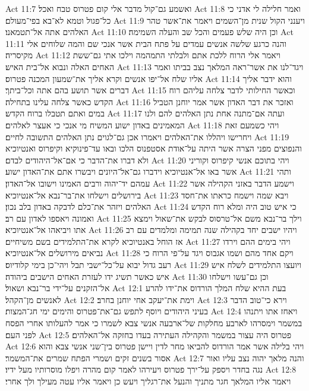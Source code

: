 Act 11:7  ואשמע גם־קול מדבר אלי קום פטרוס טבח ואכל׃
Act 11:8  ואמר חלילה לי אדני כי כל־פגול וטמא לא־בא בפי־מעולם׃
Act 11:9  ויענני הקול שנית מן־השמים ויאמר את־אשר טהר האלהים אתה אל־תטמאנו׃
Act 11:10  וכן היה שלש פעמים והכל שב והעלה השמימה׃
Act 11:11  והנה כרגע שלשה אנשים עמדים על פתח הבית אשר אנכי שם והמה שלוחים אלי מקיסריה׃
Act 11:12  ויאמר אלי הרוח ללכת אתם ולבלתי התמהמה וילכו אתי גם־ששת האחים האלה ונבוא אל־בית האיש׃
Act 11:13  ויגד־לנו את אשר־ראה המלאך נצב בביתו ואמר אליו שלח אל־יפו אנשים וקרא אליך את־שמעון המכנה פטרוס׃
Act 11:14  והוא ידבר אליך דברים אשר תושע בהם אתה וכל־ביתך׃
Act 11:15  וכאשר החילותי לדבר צלחה עליהם רוח הקדש כאשר צלחה עלינו בתחילה׃
Act 11:16  ואזכר את דבר האדון אשר אמר יוחנן הטביל במים ואתם תטבלו ברוח הקדש׃
Act 11:17  ועתה אם־מתנה אחת נתן האלהים להם ולנו המאמינים באדון ישוע המשיח מי אנכי כי אעצר לאלהים׃
Act 11:18  ויהי כשמעם זאת ויחרישו ויהללו את־האלהים ויאמרו אכן גם־לגוים נתן האלהים התשובה לחיים׃
Act 11:19  והנפוצים מפני הצרה אשר היתה על־אודת אסטפנוס הלכו ובאו עד־פינוקיא וקיפרוס ואנטיוכיא ולא דברו את־הדבר כי אם־אל־היהודים לבדם׃
Act 11:20  ויהי בתוכם אנשי קיפרוס וקוריני אשר באו אל־אנטיוכיא וידברו גם־אל־היונים ויבשרו אתם את־האדון ישוע׃
Act 11:21  ותהי עמהם יד־יהוה ורבים האמינו וישובו אל־האדון׃
Act 11:22  וישמע הדבר באזני הקהילה אשר בירושלים וישלחו את־בר־נבא אל־אנטיוכיא׃
Act 11:23  ויבא שמה וישמח כראתו את־חסד האלהים ויזהר את־כלם לדבקה באדון בלב נכון׃
Act 11:24  כי איש טוב היה ומלא רוח הקדש ואמונה ויאספו לאדון עם רב׃
Act 11:25  וילך בר־נבא משם אל־טרסוס לבקש את־שאול וימצא אתו ויביאהו אל־אנטיוכיא׃
Act 11:26  ויהיו ישבים יחד בקהילה שנה תמימה ומלמדים עם רב אז הוחל באנטיוכיא לקרא את־התלמידים בשם משיחיים׃
Act 11:27  ויהי בימים ההם וירדו נביאים מירושלים אל־אנטיוכיא׃
Act 11:28  ויקם אחד מהם ושמו אגבוס ויגד על־פי הרוח כי רעב גדול יבוא על־כל־ישבי תבל ויהי־כן בימי קלודיוס׃
Act 11:29  ויועצו התלמידים לשלח איש איש כאשר תשיג ידו לעזרת האחים הישבים ביהודה׃
Act 11:30  וכן גם־עשו וישלחו אל־הזקנים על־ידי בר־נבא ושאול׃
Act 12:1  בעת ההיא שלח המלך הורדוס את־ידו להרע לאנשים מן־הקהל׃
Act 12:2  וימת את־יעקב אחי יוחנן בחרב׃
Act 12:3  וירא כי־טוב הדבר בעיני היהודים ויוסף לתפש גם־את־פטרוס והימים ימי חג־המצות׃
Act 12:4  ויאחז אתו ויתנהו במשמר וימסרהו לארבע מחלקות של־ארבעה אנשי צבא לשמרו כי אמר להעלותו אחרי הפסח לפני העם׃
Act 12:5  פטרוס היה עצור במשמר והקהילה העתירה בעדו בחזקה אל־האלהים׃
Act 12:6  ויהי בלילה אשר אמר הורדוס להביאו מחר לדין ויישן פטרוס בין־שני אנשי צבא והוא אסור בשנים זקים ושמרי הפתח שמרים את־המשמר׃
Act 12:7  והנה מלאך יהוה נצב עליו ואור נגה בחדר ויספק על־ירך פטרוס ויעירהו לאמר קום מהרה ויפלו מוסרותיו מעל ידיו׃
Act 12:8  ויאמר אליו המלאך חגר מתניך והנעל את־רגליך ויעש כן ויאמר אליו עטה מעילך ולך אחרי׃
